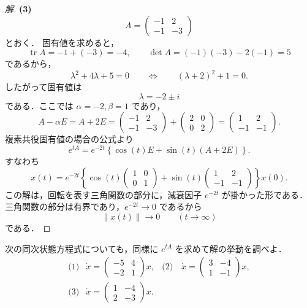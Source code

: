 \documentclass[article,paper=a4paper]{jlreq}
\begin{document}
\begin{proof}[解]
\medskip
\textbf{(3)}
\[
  A=
  \begin{pmatrix}
    -1 & 2\\
    -1 & -3
  \end{pmatrix}
\]
とおく．
固有値を求めると，
\[
  \operatorname{tr}A=-1+(-3)=-4,
  \qquad
  \det A=(-1)(-3)-2(-1)=5
\]
であるから，
\[
  \lambda^2+4\lambda+5=0
  \qquad\Longleftrightarrow\qquad
  (\lambda+2)^2+1=0.
\]
したがって固有値は
\[
  \lambda=-2\pm i
\]
である．ここでは $\alpha=-2,\beta=1$ であり，
\[
  A-\alpha E=A+2E=
  \begin{pmatrix}
    -1 & 2\\
    -1 & -3
  \end{pmatrix}
  +
  \begin{pmatrix}
    2 & 0\\
    0 & 2
  \end{pmatrix}
  =
  \begin{pmatrix}
    1 & 2\\
    -1 & -1
  \end{pmatrix}.
\]
複素共役固有値の場合の公式より
\[
  e^{tA}
    =
    e^{-2t}
    \left\{
      \cos(t)E+\sin(t)(A+2E)
    \right\}.
\]
すなわち
\[
  x(t)
    =
    e^{-2t}
    \left\{
      \cos(t)
      \begin{pmatrix}
        1 & 0\\
        0 & 1
      \end{pmatrix}
      +
      \sin(t)
      \begin{pmatrix}
        1 & 2\\
        -1 & -1
      \end{pmatrix}
    \right\}x(0).
\]
この解は，回転を表す三角関数の部分に，減衰因子 $e^{-2t}$ が掛かった形である．
三角関数の部分は有界であり，$e^{-2t}\to0$ であるから
\[
  \|x(t)\|\to0
  \qquad (t\to\infty)
\]
である．
\end{proof}

\begin{exe}
次の同次状態方程式についても，同様に $e^{tA}$ を求めて解の挙動を調べよ．
\[
  \begin{array}{lll}
    \text{(1)}&
    \displaystyle
    \dot{x}=
    \begin{pmatrix}
      -5 & 4\\
      -2 & 1
    \end{pmatrix}x,
    &
    \text{(2)}\quad 
    \displaystyle
    \dot{x}=
    \begin{pmatrix}
      3 & -4\\
      1 & -1
    \end{pmatrix}x,\\[5mm]
    \text{(3)}&
    \displaystyle
    \dot{x}=
    \begin{pmatrix}
      1 & -4\\
      2 & -3
    \end{pmatrix}x.
  \end{array}
\]
\end{exe}
\end{document}
